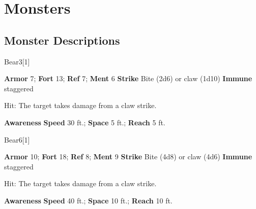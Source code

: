 \chapter{Monsters}
\section{Monster Descriptions}
\begin{monsection}[Black]{Bear}{3}[1]
\begin{spellcontent}
\begin{spelltargetinginfo}
\pari \textbf{Armor} 7; \textbf{Fort} 13; \textbf{Ref} 7; \textbf{Ment} 6
\pari \textbf{Strike} Bite  (2d6) or claw  (1d10)
\pari \textbf{Immune} staggered
\end{spelltargetinginfo}
\begin{spelleffects}
\pari {}
\par Hit: The target takes damage from a claw strike.
\end{spelleffects}
\end{spellcontent}
\begin{spellfooter}
\pari \textbf{Awareness} 
\pari \textbf{Speed} 30 ft.; \textbf{Space} 5 ft.; \textbf{Reach} 5 ft.
\end{spellfooter}
\end{monsection}
\begin{monsection}[Brown]{Bear}{6}[1]
\begin{spellcontent}
\begin{spelltargetinginfo}
\pari \textbf{Armor} 10; \textbf{Fort} 18; \textbf{Ref} 8; \textbf{Ment} 9
\pari \textbf{Strike} Bite  (4d8) or claw  (4d6)
\pari \textbf{Immune} staggered
\end{spelltargetinginfo}
\begin{spelleffects}
\pari {}
\par Hit: The target takes damage from a claw strike.
\end{spelleffects}
\end{spellcontent}
\begin{spellfooter}
\pari \textbf{Awareness} 
\pari \textbf{Speed} 40 ft.; \textbf{Space} 10 ft.; \textbf{Reach} 10 ft.
\end{spellfooter}
\end{monsection}
